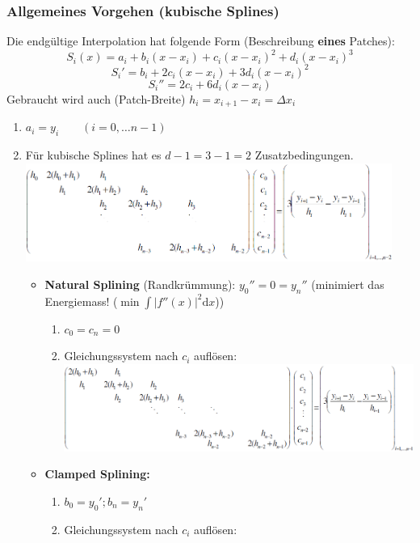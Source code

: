 \subsubsection{Allgemeines Vorgehen (kubische Splines)}
Die endgültige Interpolation hat folgende Form (Beschreibung \textbf{eines} Patches):
$$\boxed{S_i(x) = a_i + b_i(x-x_i) + c_i(x-x_i)^2 + d_i(x-x_i)^3}$$
$$S_i' = b_i + 2c_i(x-x_i)+3d_i(x-x_i)^2$$
$$S_i'' = 2c_i + 6 d_i (x-x_i)$$
Gebraucht wird auch (Patch-Breite) $h_i = x_{i+1} - x_i = \Delta x_i$ 
\begin{enumerate}
  \item $a_i = y_i \qquad (i=0,\ldots n-1)$
  \item Für kubische Splines hat es $d-1=3-1=2$ Zusatzbedingungen.\\ \includegraphics[width=12cm]{./bilder/1d_spline_gleichungssystem}
\newpage
    \begin{itemize}
      \item \textbf{Natural Splining} (Randkrümmung): $y_0''=0=y_n''$ (minimiert das Energiemass! ($\min \int |f''(x)|^2 \mathrm{d}x$))
        \begin{enumerate}
          \item $c_0 = c_n = 0$
          \item Gleichungssystem nach $c_i$ auflösen:\\
            \includegraphics[width=13cm]{./bilder/1d_spline_natural_gleichungssystem}
        \end{enumerate}        
       \item \textbf{Clamped Splining:}
         \begin{enumerate}
           \item $b_0 = y_0'; b_n=y_n'$
           \item Gleichungssystem nach $c_i$ auflösen:\\

\end{enumerate}
\end{itemize}
\end{enumerate}
